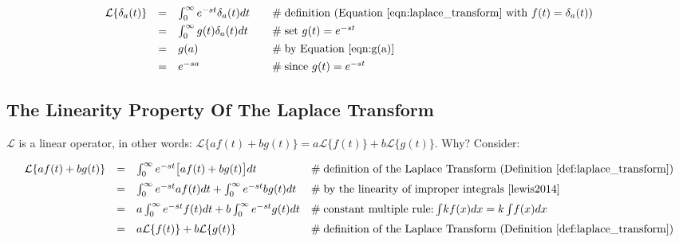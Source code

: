 \documentclass{article}
\theoremstyle{definition}
\begin{document}
\bigskip
\begin{equation*}
\begin{array}{lllll}
\mathcal{L}\{\delta_a(t)\} 
&=& \int_0^\infty  e^{-st} \delta_a(t) dt    &\quad  \mathrel{\#} \text{definition (Equation \ref{eqn:laplace_transform} with $f(t) = \delta_a(t)$)} \\  
[4pt]                                                        %
&=& \int_0^\infty g(t) \delta_a(t) dt         &\quad  \mathrel{\#} \text{set $g(t) = e^{-st}$}                                                                                      \\
[4pt]                                                        %
&=& g(a)                                                &\quad  \mathrel{\#} \text{by Equation \ref{eqn:g(a)}}                                                                           \\
[4pt]                                                        %
&=& e^{-sa}                                            &\quad  \mathrel{\#} \text{since $g(t) = e^{-st}$}
\end{array}
\end{equation*}

\subsection{The Linearity Property Of The Laplace Transform}
\label{subsec:linearity}
\bigskip
\noindent
$\mathcal{L}$ is a linear operator, in other words: $\mathcal{L}\{af (t) + bg(t)\} = a\mathcal{L}\{f(t)\} + b\mathcal{L}\{g(t)\}$. Why? Consider:

\bigskip
\begin{equation*}
\begin{array}{lllll}
\mathcal{L}\{af(t) + bg(t)\} 
&=& \int_0^\infty e^{-st} \big [af (t) + bg(t) \big] dt                                & \mathrel{\#} \text{definition of the Laplace Transform (Definition \ref{def:laplace_transform})}   \\  
[6pt]                                                                                                     %
&=& \int_0^\infty e^{-st} af (t)  dt + \int_0^\infty e^{-st}  bg(t)  dt          & \mathrel{\#} \text{by the linearity of improper integrals \cite{lewis2014}}                                     \\
[6pt]                                                                                                     %
&=& a \int_0^\infty e^{-st}  f(t) dt + b \int_0^\infty e^{-st}  g(t) dt          & \mathrel{\#} \text{constant multiple rule:} \int \! k f(x) dx = k \int \! f(x) dx                                    \\
[6pt]                                                                                                     %
&=& a \mathcal{L}\{f(t)\}  + b \mathcal{L}\{g(t)\}                                   & \mathrel{\#} \text{definition of the Laplace Transform  (Definition \ref{def:laplace_transform})}
\end{array}
\end{equation*}
\end{document}

